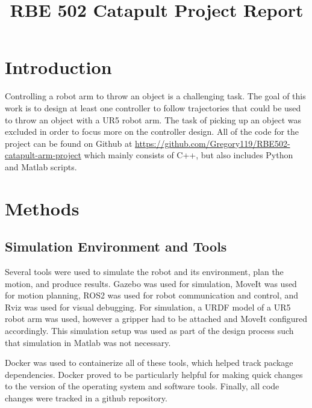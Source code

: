 \documentclass[conference]{IEEEtran}
\begin{document}
\title{RBE 502 Catapult Project Report}

\author{
}

\maketitle


\section{Introduction}
Controlling a robot arm to throw an object is a challenging task. The goal of
this work is to design at least one controller to follow trajectories that could
be used to throw an object with a UR5 robot arm. The task of picking up an
object was excluded in order to focus more on the controller design. All of the
code for the project can be found on Github at
\url{https://github.com/Gregory119/RBE502-catapult-arm-project} which mainly
consists of C++, but also includes Python and Matlab scripts.

\section{Methods}

\subsection{Simulation Environment and Tools}
Several tools were used to simulate the robot and its environment, plan the
motion, and produce results. Gazebo was used for simulation, MoveIt was used for
motion planning, ROS2 was used for robot communication and control, and Rviz was
used for visual debugging. For simulation, a URDF model of a UR5 robot arm was
used, however a gripper had to be attached and MoveIt configured
accordingly. This simulation setup was used as part of the design process such
that simulation in Matlab was not necessary.

Docker was used to containerize all of these tools, which helped track
package dependencies. Docker proved to be particularly helpful for making quick
changes to the version of the operating system and software tools. Finally, all
code changes were tracked in a github repository.
\end{document}
